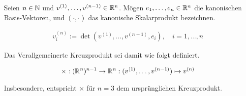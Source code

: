 \begin{definition*}

Seien $n \in \mathbb{N}$ und $v^{(1)}, \ldots, v^{(n-1)} \in \mathbb{R}^n$.
Mögen $e_1, \ldots, e_n \in \mathbb{R}^n$ die kanonischen Basis-Vektoren, und $(\cdot, \cdot)$ das kanonische Skalarprodukt bezeichnen.

\begin{align*}
  v^{(n)}_i := \det{(v^{(1)}, \ldots, v^{(n-1)}, e_i)},
  \quad
  i = 1, \ldots, n
\end{align*}

Das Verallgemeinerte Kreuzprodukt sei damit wie folgt definiert.

\begin{align*}
  \times:
  (\mathbb{R}^n)^{n-1} \to \mathbb{R}^n:
  (v^{(1)}, \ldots, v^{(n-1)})
  \mapsto
  v^{(n)}
\end{align*}

Insbesondere, entspricht $\times$ für $n = 3$ dem ursprünglichen Kreuzprodukt.

\end{definition*}
